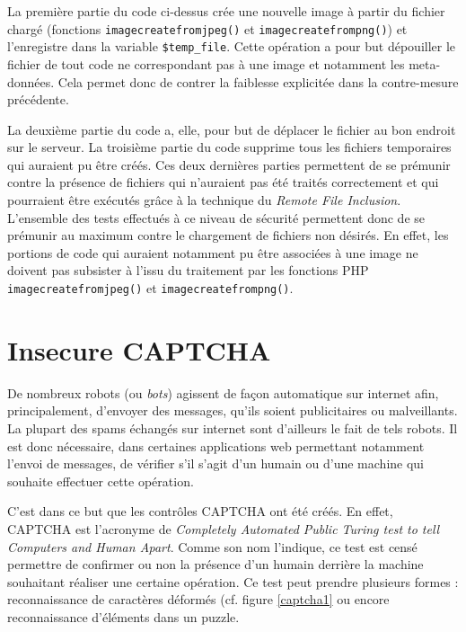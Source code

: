 La première partie du code ci-dessus crée une nouvelle image à partir du fichier chargé (fonctions \texttt{imagecreatefromjpeg()} et \texttt{imagecreatefrompng()}) et l'enregistre dans la variable \texttt{\$temp\_file}. Cette opération a pour but dépouiller le fichier de tout code ne correspondant pas à une image et notamment les meta-données. Cela permet donc de contrer la faiblesse explicitée dans la contre-mesure précédente.

La deuxième partie du code a, elle, pour but de déplacer le fichier au bon endroit sur le serveur. La troisième partie du code supprime tous les fichiers temporaires qui auraient pu être créés. Ces deux dernières parties permettent de se prémunir contre la présence de fichiers qui n'auraient pas été traités correctement et qui pourraient être exécutés grâce à la technique du \textit{Remote File Inclusion}.\\

L'ensemble des tests effectués à ce niveau de sécurité permettent donc de se prémunir au maximum contre le chargement de fichiers non désirés. En effet, les portions de code qui auraient notamment pu être associées à une image ne doivent pas subsister à l'issu du traitement par les fonctions PHP \texttt{imagecreatefromjpeg()} et \texttt{imagecreatefrompng()}.

\clearpage

\newpage

\section{Insecure CAPTCHA}

De nombreux robots (ou \textit{bots}) agissent de façon automatique sur internet afin, principalement, d'envoyer des messages, qu'ils soient publicitaires ou malveillants. La plupart des spams échangés sur internet sont d'ailleurs le fait de tels robots. Il est donc nécessaire, dans certaines applications web permettant notamment l'envoi de messages, de vérifier s'il s'agit d'un humain ou d'une machine qui souhaite effectuer cette opération.

C'est dans ce but que les contrôles CAPTCHA ont été créés. En effet, CAPTCHA est l'acronyme de \textit{Completely Automated Public Turing test to tell Computers and Human Apart}. Comme son nom l'indique, ce test est censé permettre de confirmer ou non la présence d'un humain derrière la machine souhaitant réaliser une certaine opération. Ce test peut prendre plusieurs formes : reconnaissance de caractères déformés (cf. figure \ref{captcha1} ou encore reconnaissance d'éléments dans un puzzle.

